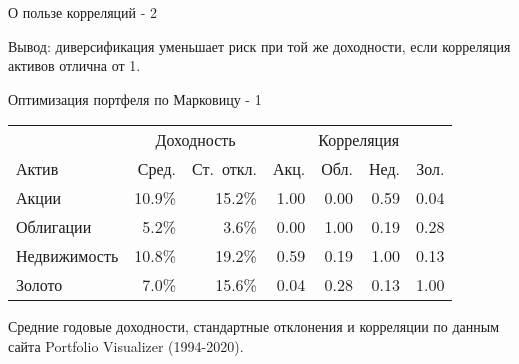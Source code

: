 \documentclass{beamer}
\begin{document}
\begin{frame}{О пользе корреляций - 2}
\center
{}

\justify
Вывод: диверсификация уменьшает риск при той же доходности, если корреляция активов отлична от 1.
\end{frame}



\begin{frame}{Оптимизация портфеля по Марковицу - 1}
\centering
\begin{tabular}{l|r|r|r|r|r|r}
 & \multicolumn{2}{c|}{Доходность} & \multicolumn{4}{c}{Корреляция} \\ \cline{2-7}
Актив         & Сред.  & Ст.~откл. & Акц. & Обл. & Нед. & Зол. \\ \hline
Акции         & 10.9\% & 15.2\%    & 1.00  & 0.00   & 0.59    & 0.04 \\
Облигации     & 5.2\%  & 3.6\%     & 0.00  & 1.00   & 0.19    & 0.28 \\
Недвижимость  & 10.8\% & 19.2\%    & 0.59  & 0.19   & 1.00    & 0.13 \\
Золото        & 7.0\%  & 15.6\%    & 0.04  & 0.28   & 0.13    & 1.00
\end{tabular}

\justify
\scriptsize
Средние годовые доходности, стандартные отклонения и корреляции по данным сайта Portfolio Visualizer (1994-2020).
\end{frame}
\end{document}
